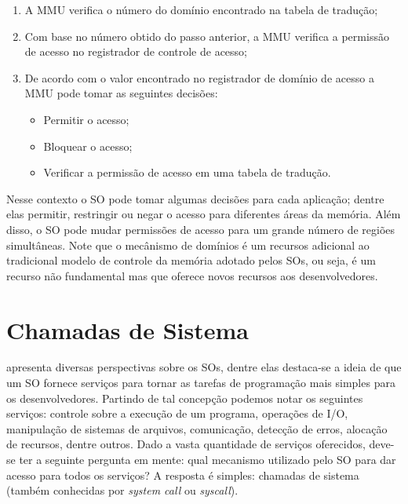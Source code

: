 \begin{enumerate}
  \item A MMU verifica o número do domínio encontrado na tabela de tradução;
  \item Com base no número obtido do passo anterior, a MMU verifica a permissão
        de acesso no registrador de controle de acesso;
  \item De acordo com o valor encontrado no registrador de domínio de acesso a
        MMU pode tomar as seguintes decisões:
  \begin{itemize}
    \item Permitir o acesso;
    \item Bloquear o acesso;
    \item Verificar a permissão de acesso em uma tabela de tradução.
  \end{itemize}
\end{enumerate}

Nesse contexto o SO pode tomar algumas decisões para cada aplicação; dentre
elas permitir, restringir ou negar o acesso para diferentes áreas da memória.
Além disso, o SO pode mudar permissões de acesso para um grande número de
regiões simultâneas. Note que o mecânismo de domínios é um recursos adicional
ao tradicional modelo de controle da memória adotado pelos SOs, ou seja, é
um recurso não fundamental mas que oferece novos recursos aos desenvolvedores.

\section{Chamadas de Sistema}

\cite{silberschatz} apresenta diversas perspectivas sobre os SOs, dentre elas
destaca-se a ideia de que um SO fornece serviços para tornar as tarefas de
programação mais simples para os desenvolvedores. Partindo de tal concepção
podemos notar os seguintes serviços: controle sobre a execução de um programa,
operações de I/O, manipulação de sistemas de arquivos, comunicação, detecção de
erros, alocação de recursos, dentre outros. Dado a vasta quantidade de serviços
oferecidos, deve-se ter a seguinte pergunta em mente: qual mecanismo utilizado
pelo SO para dar acesso para todos os serviços? A resposta é simples: chamadas
de sistema (também conhecidas por \emph{system call} ou \emph{syscall}).

